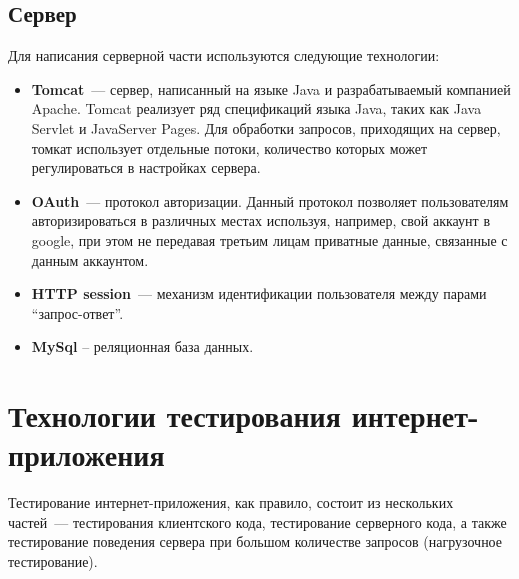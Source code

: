 \subsection{Сервер}
	Для написания серверной части используются следующие технологии:
\begin{itemize}
\item \textbf{Tomcat}~--- сервер, написанный на языке Java и разрабатываемый компанией Apache. Tomcat реализует ряд спецификаций языка Java, таких как Java Servlet и JavaServer Pages. Для обработки запросов, приходящих на сервер, томкат использует отдельные потоки, количество которых может регулироваться в настройках сервера.
\item \textbf{OAuth}~--- протокол авторизации. Данный протокол позволяет пользователям авторизироваться в различных местах используя, например, свой аккаунт в google, при этом не передавая третьим лицам приватные данные, связанные с данным аккаунтом.
\item \textbf{HTTP session}~--- механизм идентификации пользователя между парами ``запрос-ответ''.
\item \textbf{MySql} -- реляционная база данных.
\end{itemize}
	
\section{Технологии тестирования интернет-прило\-же\-ния}
	Тестирование интернет-приложения, как правило, состоит из нескольких частей~--- тестирования клиентского кода, тестирование серверного кода, а также тестирование поведения сервера при большом количестве запросов (нагрузочное тестирование).
	
